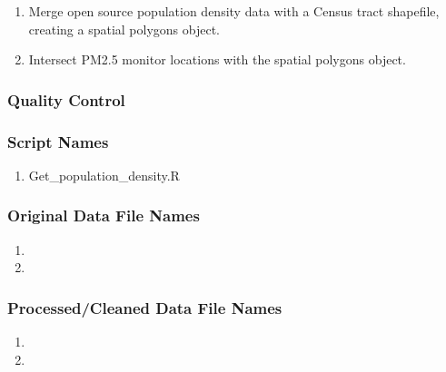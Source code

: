 \begin{enumerate}
\item Merge open source population density data with a Census tract shapefile, creating a spatial polygons object.
\item Intersect PM2.5 monitor locations with the spatial polygons object. 
\end{enumerate}

\subsubsection*{Quality Control}

\subsubsection*{Script Names}

\begin{enumerate}
\item Get_population_density.R
\end{enumerate}

\subsubsection*{Original Data File Names}

\begin{enumerate}
\item 
\item 
\end{enumerate}

\subsubsection*{Processed/Cleaned Data File Names}

\begin{enumerate}
\item 
\item 
\end{enumerate}

